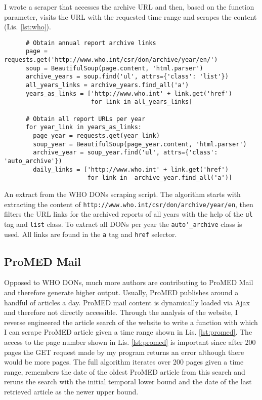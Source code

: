   I wrote a scraper that accesses the archive URL and then, based on the function parameter, visits the URL with the requested time range and scrapes the content (Lis. \ref{lst:who}).

  \begin{listing}[h]
    \begin{verbatim}
      # Obtain annual report archive links
      page = requests.get('http://www.who.int/csr/don/archive/year/en/')
      soup = BeautifulSoup(page.content, 'html.parser')
      archive_years = soup.find('ul', attrs={'class': 'list'})
      all_years_links = archive_years.find_all('a')
      years_as_links = ['http://www.who.int' + link.get('href')
                        for link in all_years_links]

      # Obtain all report URLs per year
      for year_link in years_as_links:
        page_year = requests.get(year_link)
        soup_year = BeautifulSoup(page_year.content, 'html.parser')
        archive_year = soup_year.find('ul', attrs={'class': 'auto_archive'})
        daily_links = ['http://www.who.int' + link.get('href')
                       for link in  archive_year.find_all('a')]
    \end{verbatim}
    \caption{An extract from the WHO DONs scraping script. The algorithm starts with extracting the content of \textquotesingle \texttt{http://www.who.int/csr/don/archive/year/en}\textquotesingle, then filters the URL links for the archived reports of all years with the help of the \texttt{ul} tag and \texttt{list} class. To extract all DONs per year the \texttt{auto\char`_archive} class is used. All links are found in the \texttt{a} tag and \texttt{href} selector.}
    \label{lst:who}
  \end{listing}

\subsection{ProMED Mail}
  Opposed to WHO DONs, much more authors are contributing to ProMED Mail and therefore generate higher output.
  Usually, ProMED publishes around a handful of articles a day.
  ProMED mail content is dynamically loaded via Ajax and therefore not directly accessible.
  Through the analysis of the website, I reverse engineered the article search of the website to write a function with which I can scrape ProMED article given a time range shown in Lis. \ref{lst:promed}.
  The access to the page number shown in Lis. \ref{lst:promed} is important since after 200 pages the GET request made by my program returns an error although there would be more pages.
  The full algorithm iterates over 200 pages given a time range, remembers the date of the oldest ProMED article from this search and reruns the search with the initial temporal lower bound and the date of the last retrieved article as the newer upper bound.

